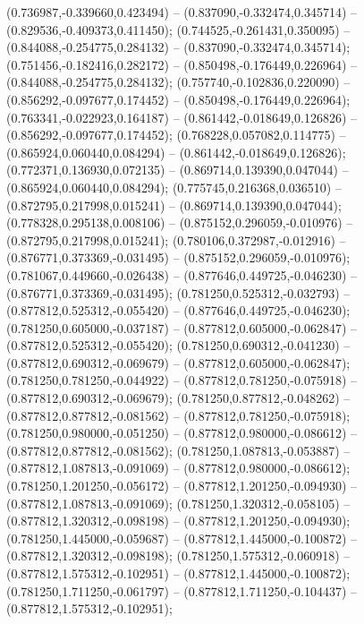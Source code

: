  (0.736987,-0.339660,0.423494) -- (0.837090,-0.332474,0.345714) -- (0.829536,-0.409373,0.411450);
 (0.744525,-0.261431,0.350095) -- (0.844088,-0.254775,0.284132) -- (0.837090,-0.332474,0.345714);
 (0.751456,-0.182416,0.282172) -- (0.850498,-0.176449,0.226964) -- (0.844088,-0.254775,0.284132);
 (0.757740,-0.102836,0.220090) -- (0.856292,-0.097677,0.174452) -- (0.850498,-0.176449,0.226964);
 (0.763341,-0.022923,0.164187) -- (0.861442,-0.018649,0.126826) -- (0.856292,-0.097677,0.174452);
 (0.768228,0.057082,0.114775) -- (0.865924,0.060440,0.084294) -- (0.861442,-0.018649,0.126826);
 (0.772371,0.136930,0.072135) -- (0.869714,0.139390,0.047044) -- (0.865924,0.060440,0.084294);
 (0.775745,0.216368,0.036510) -- (0.872795,0.217998,0.015241) -- (0.869714,0.139390,0.047044);
 (0.778328,0.295138,0.008106) -- (0.875152,0.296059,-0.010976) -- (0.872795,0.217998,0.015241);
 (0.780106,0.372987,-0.012916) -- (0.876771,0.373369,-0.031495) -- (0.875152,0.296059,-0.010976);
 (0.781067,0.449660,-0.026438) -- (0.877646,0.449725,-0.046230) -- (0.876771,0.373369,-0.031495);
 (0.781250,0.525312,-0.032793) -- (0.877812,0.525312,-0.055420) -- (0.877646,0.449725,-0.046230);
 (0.781250,0.605000,-0.037187) -- (0.877812,0.605000,-0.062847) -- (0.877812,0.525312,-0.055420);
 (0.781250,0.690312,-0.041230) -- (0.877812,0.690312,-0.069679) -- (0.877812,0.605000,-0.062847);
 (0.781250,0.781250,-0.044922) -- (0.877812,0.781250,-0.075918) -- (0.877812,0.690312,-0.069679);
 (0.781250,0.877812,-0.048262) -- (0.877812,0.877812,-0.081562) -- (0.877812,0.781250,-0.075918);
 (0.781250,0.980000,-0.051250) -- (0.877812,0.980000,-0.086612) -- (0.877812,0.877812,-0.081562);
 (0.781250,1.087813,-0.053887) -- (0.877812,1.087813,-0.091069) -- (0.877812,0.980000,-0.086612);
 (0.781250,1.201250,-0.056172) -- (0.877812,1.201250,-0.094930) -- (0.877812,1.087813,-0.091069);
 (0.781250,1.320312,-0.058105) -- (0.877812,1.320312,-0.098198) -- (0.877812,1.201250,-0.094930);
 (0.781250,1.445000,-0.059687) -- (0.877812,1.445000,-0.100872) -- (0.877812,1.320312,-0.098198);
 (0.781250,1.575312,-0.060918) -- (0.877812,1.575312,-0.102951) -- (0.877812,1.445000,-0.100872);
 (0.781250,1.711250,-0.061797) -- (0.877812,1.711250,-0.104437) -- (0.877812,1.575312,-0.102951);
